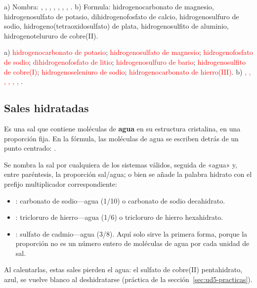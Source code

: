 \begin{exercise}
    a) Nombra: , , , , , , , . b)
    Formula: hidrogenocarbonato de magnesio, hidrogenosulfato de potasio, dihidrogenofosfato de calcio, hidrogenosulfuro de
    sodio, hidrogeno(tetraoxidosulfato) de plata, hidrogenosulfito de aluminio, hidrogenotelururo de cobre(II).
    \begin{solu}
        a) \textcolor{red}{hidrogenocarbonato de potasio}; \textcolor{red}{hidrogenosulfato de magnesio}; \textcolor{red}{hidrogenofosfato
        de sodio}; \textcolor{red}{dihidrogenofosfato de litio}; \textcolor{red}{hidrogenosulfuro de bario};
        \textcolor{red}{hidrogenosulfito de cobre(I)}; \textcolor{red}{hidrogenoseleniuro de sodio};
        \textcolor{red}{hidrogenocarbonato de hierro(III)}. b) \textcolor{red}{, , ,
        , , , }.
    \end{solu}
\end{exercise}

\subsection{Sales hidratadas}\label{sec:ud5-hidratadas}

\begin{definition}
    Es una sal que contiene moléculas de \textbf{agua} en su estructura cristalina, en una proporción fija. En la fórmula, las
    moléculas de agua se escriben detrás de un punto centrado: .
\end{definition}

Se nombra la sal por cualquiera de los sistemas válidos, seguida de «agua» y, entre paréntesis, la proporción sal/agua; o bien
se añade la palabra hidrato con el prefijo multiplicador correspondiente:
\begin{itemize}
    \item {}: carbonato de sodio---agua (1/10) o carbonato de sodio decahidrato.
    \item {}: tricloruro de hierro---agua (1/6) o tricloruro de hierro hexahidrato.
    \item {}: sulfato de cadmio---agua (3/8). Aquí solo sirve la primera forma, porque la proporción no es un
    número entero de moléculas de agua por cada unidad de sal.
\end{itemize}
Al calentarlas, estas sales pierden el agua: el sulfato de cobre(II) pentahidrato, azul, se vuelve blanco al deshidratarse
(práctica de la sección~\ref{sec:ud5-practicas}).

